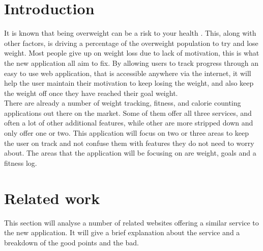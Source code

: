 \section{Introduction}
It is known that being overweight can be a risk to your health \citep{theordre:1985}. This, along with other factors, is driving a percentage of the overweight population to try and lose weight. Most people give up on weight loss due to lack of motivation, this is what the new application all aim to fix. By allowing users to track progress through an easy to use web application, that is accessible anywhere via the internet, it will help the user maintain their motivation to keep losing the weight, and also keep the weight off once they have reached their goal weight.\\

There are already a number of weight tracking, fitness, and calorie counting applications out there on the market. Some of them offer all three services, and often a lot of other additional features, while other are more stripped down and only offer one or two. This application will focus on two or three areas to keep the user on track and not confuse them with features they do not need to worry about. The areas that the application will be focusing on are weight, goals and a fitness log.

\section{Related work}
This section will analyse a number of related websites offering a similar service to the new application. It will give a brief explanation about the service and a breakdown of the good points and the bad.


